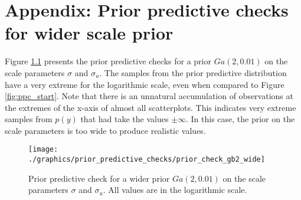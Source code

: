 \chapter{Appendix: Prior predictive checks for wider scale prior}
\label{appendix:wide_prior}

Figure \ref{fig:ppc_wide} presents the prior predictive checks for a prior $Ga(2, 0.01)$ on the scale parameters $\sigma$ and $\sigma_u$.
The samples from the prior predictive distribution have a very extreme for the logarithmic scale, even when compared to Figure \ref{fig:ppc_start}.
Note that there is an unnatural accumulation of observations at the extremes of the x-axis of almost all scatterplots.
This indicates very extreme samples from $p(y)$ that had take the values $\pm \infty$.
In this case, the prior on the scale parameters is too wide to produce realistic values.

\begin{figure}[h]
    \centering
    \texttt{[image: ./graphics/prior\_predictive\_checks/prior\_check\_gb2\_wide]}
    \caption[Prior predictive checks for wider scale prior.]{Prior predictive check for a wider prior $Ga(2, 0.01)$ on the scale parameters $\sigma$ and $\sigma_u$. All values are in the logarithmic scale.}
    \label{fig:ppc_wide}
\end{figure}

